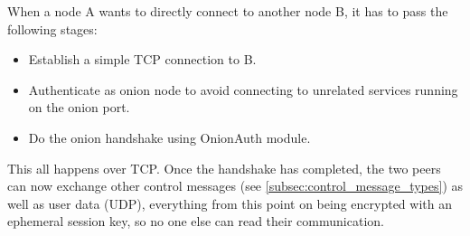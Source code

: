 \documentclass{article}
\begin{document}
When a node A wants to directly connect to another node B, it has to pass the following stages:
\begin{itemize}
	\item Establish a simple TCP connection to B.
	\item Authenticate as onion node to avoid connecting to unrelated services running on the onion port.
	\item Do the onion handshake using OnionAuth module.
\end{itemize}
This all happens over TCP. Once the handshake has completed, the two peers can now exchange other control messages (see \ref{subsec:control_message_types}) as well as user data (UDP), everything from this point on being encrypted with an ephemeral session key, so no one else can read their communication. \\

\label{subsec:control_message_types}
\end{document}
